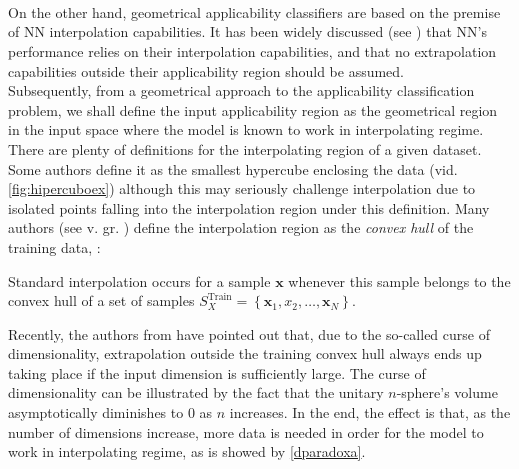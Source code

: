 \paragraph{ \\}
On the other hand, geometrical applicability classifiers are based on the premise of NN interpolation capabilities. It has been widely discussed (see \eg \cite{pmlr-v80-barrett18a,DBLP:journals/corr/abs-1711-00350,DBLP:journals/corr/abs-1904-01557}) that NN's performance relies on their interpolation capabilities, and that no extrapolation capabilities outside their applicability region should be assumed.\\
%
\indent Subsequently, from a geometrical approach to the applicability classification problem, we shall define the input applicability region as the geometrical region in the input space where the model is known to work in interpolating regime.\\
%
\indent There are plenty of definitions for the interpolating region of a given dataset. Some authors define it as the smallest hypercube enclosing the data\cite{ebert2014interpolation} (vid. \cref{fig:hipercuboex}) although this may seriously challenge interpolation due to isolated points falling into the interpolation region under this definition. Many authors (see v. gr. \cite{loh2007extrapolation,4505337}) define the interpolation region as the \textit{convex hull} of the training data, \ie:

\begin{definition}\cite{balestriero2021learning}\label{def:interpolacion}
	Standard interpolation occurs for a sample $\mathbf{x}$ whenever this sample belongs to the convex hull of a set of samples $S^\text{Train}_X=\left\{\mathbf{x}_1,x_2,\ldots,\mathbf{x}_N\right\}$.
\end{definition}

\indent Recently, the authors from \cite{balestriero2021learning} have pointed out that, due to the so-called curse of dimensionality, extrapolation outside the training convex hull always ends up taking place if the input dimension is sufficiently large. The curse of dimensionality\cite[pp. 17-18]{Marsland2015Machine} can be illustrated by the fact that the unitary $n$-sphere's volume asymptotically diminishes to $0$ as $n$ increases. In the end, the effect is that, as the number of dimensions increase, more data is needed in order for the model to work in interpolating regime, as is showed by \autoref{dparadoxa}.\\

